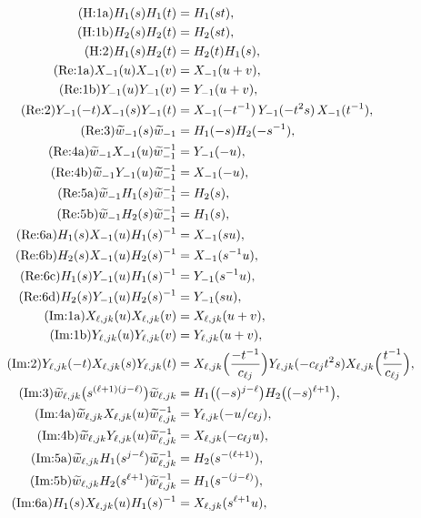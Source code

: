 \documentclass[11pt]{article}
\theoremstyle{definition}
\theoremstyle{remark}
\newcommand{\wt}{\widetilde{w}}
\begin{document}
\begingroup\allowdisplaybreaks
\begin{align*}
\tag{H:1a} H_1(s)H_1(t)&=H_1(st),\\
\tag{H:1b} H_2(s)H_2(t)&=H_2(st),\\
\tag{H:2} H_1(s)H_2(t)&=H_2(t)H_1(s),\\
\tag{Re:1a} X_{-1}(u)X_{-1}(v)&=X_{-1}(u+v),\\
\tag{Re:1b} Y_{-1}(u)Y_{-1}(v)&=Y_{-1}(u+v),\\
\tag{Re:2} Y_{-1}(-t)X_{-1}(s)Y_{-1}(t)&=X_{-1}(-t^{-1})\,Y_{-1}(-t^2s)\,X_{-1}(t^{-1}),\\
\tag{Re:3} \wt_{-1}(s)\wt_{-1}&=H_1(-s)H_2(-s^{-1}),\\
\tag{Re:4a} \wt_{-1}X_{-1}(u)\wt_{-1}^{-1}&=Y_{-1}(-u),\\
\tag{Re:4b} \wt_{-1}Y_{-1}(u)\wt_{-1}^{-1}&=X_{-1}(-u),\\
\tag{Re:5a} \wt_{-1}H_1(s)\wt_{-1}^{-1}&=H_2(s),\\
\tag{Re:5b} \wt_{-1}H_2(s)\wt_{-1}^{-1}&=H_1(s),\\
\tag{Re:6a} H_1(s)X_{-1}(u)H_1(s)^{-1}&=X_{-1}(su),\\
\tag{Re:6b} H_2(s)X_{-1}(u)H_2(s)^{-1}&=X_{-1}(s^{-1}u),\\
\tag{Re:6c} H_1(s)Y_{-1}(u)H_1(s)^{-1}&=Y_{-1}(s^{-1}u),\\
\tag{Re:6d} H_2(s)Y_{-1}(u)H_2(s)^{-1}&=Y_{-1}(su),\\
\tag{Im:1a} X_{\ell,jk}(u)X_{\ell,jk}(v)&=X_{\ell,jk}(u+v),\\
\tag{Im:1b} Y_{\ell,jk}(u)Y_{\ell,jk}(v)&=Y_{\ell,jk}(u+v),\\
\tag{Im:2} Y_{\ell,jk}(-t)X_{\ell,jk}(s)Y_{\ell,jk}(t)&=X_{\ell,jk}\Bigl(\frac{-t^{-1}}{c_{\ell j}}\Bigr)Y_{\ell,jk}(-c_{\ell j}t^2s)X_{\ell,jk}\Bigl(\frac{t^{-1}}{c_{\ell j}}\Bigr),\\
\tag{Im:3} \wt_{\ell,jk}\bigl(s^{(\ell+1)(j-\ell)}\bigr)\wt_{\ell,jk}&=H_1\bigl((-s)^{j-\ell}\bigr)H_2\bigl((-s)^{\ell+1}\bigr),\\
\tag{Im:4a} \wt_{\ell,jk}X_{\ell,jk}(u)\wt_{\ell,jk}^{-1}&=Y_{\ell,jk}(-u/c_{\ell j}),\\
\tag{Im:4b} \wt_{\ell,jk}Y_{\ell,jk}(u)\wt_{\ell,jk}^{-1}&=X_{\ell,jk}(-c_{\ell j}u),\\
\tag{Im:5a} \wt_{\ell,jk}H_1(s^{j-\ell})\wt_{\ell,jk}^{-1}&=H_2(s^{-(\ell+1)}),\\
\tag{Im:5b} \wt_{\ell,jk}H_2(s^{\ell+1})\wt_{\ell,jk}^{-1}&=H_1(s^{-(j-\ell)}),\\
\tag{Im:6a} H_1(s)X_{\ell,jk}(u)H_1(s)^{-1}&=X_{\ell,jk}(s^{\ell+1}u),\\

\end{align*}
\end{document}
